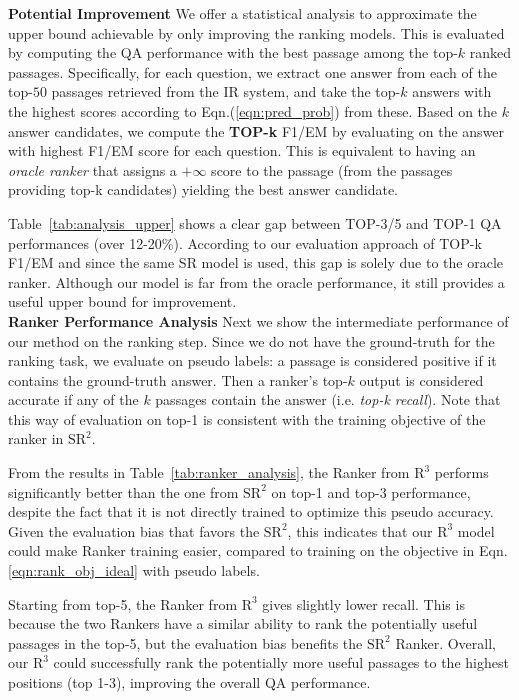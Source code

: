 \documentclass[letterpaper]{article} \usepackage{aaai18}  \usepackage{times}  \usepackage{helvet}  \usepackage{courier}  \usepackage{url}  \usepackage{graphicx}  \usepackage{comment}
\begin{document}
\noindent\textbf{Potential Improvement}\quad
We offer a statistical analysis to approximate the upper bound achievable by only improving the ranking models.
This is evaluated by computing the QA performance with the best passage among the top-$k$ ranked passages.
Specifically, for each question, we extract one answer from each of the top-$50$ passages retrieved from the IR system, and take the top-$k$ answers with the highest scores according to Eqn.(\ref{eqn:pred_prob}) from these.
Based on the $k$ answer candidates, we compute the \textbf{TOP-k} F1/EM by evaluating on the answer with highest F1/EM score for each question. This is equivalent to having an \emph{oracle ranker} that assigns a $+\infty$ score to the passage (from the passages providing top-k candidates) yielding the best answer candidate.

Table~\ref{tab:analysis_upper} shows a clear gap between TOP-3/5 and TOP-1 QA performances (over 12-20\%). According to our evaluation approach of TOP-k F1/EM and since the same SR model is used, this gap is
solely due to
the oracle ranker. Although our model is far from the oracle performance, it still provides a useful upper bound for improvement. \\

\noindent\textbf{Ranker Performance Analysis}\quad
Next we show the intermediate performance of our method on the ranking step.
Since we do not have the ground-truth for the ranking task, we evaluate on pseudo labels: a passage is considered  positive if it contains the ground-truth answer. Then a ranker's top-$k$ output is considered accurate if any of the $k$ passages contain the answer (i.e. \emph{top-k recall}). 
Note that this way of evaluation on top-1 is consistent with the training objective of the ranker in $\text{SR}^2$.

From the results in Table~\ref{tab:ranker_analysis}, the Ranker from $\text{R}^3$ performs significantly better than the one from $\text{SR}^2$ on top-1 and top-3 performance, despite the fact that it is not directly trained to optimize this pseudo accuracy. Given the evaluation bias that favors the $\text{SR}^2$, this indicates that our $\text{R}^3$ model could make Ranker training easier, compared to training on the objective in Eqn.\ref{eqn:rank_obj_ideal} with pseudo labels.

{Starting from top-5, the Ranker from $\text{R}^3$ gives slightly lower recall. This is because the two Rankers have a similar ability to rank the potentially useful passages in the top-5, but the evaluation bias benefits the $\text{SR}^2$ Ranker. 
Overall, our $\text{R}^3$ could successfully rank the potentially more useful passages to the highest positions (top 1-3), improving the overall QA performance.}
\end{document}
